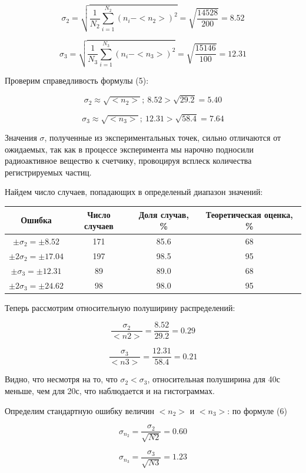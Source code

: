 \documentclass[14pt]{article}
\begin{document}
$$\sigma_2 = \sqrt{\frac{1}{N_2} \sum_{i = 1}^{N_2} (n_i - <n_2>)^2} = \sqrt{\frac{14528}{200}} = 8.52$$

$$\sigma_3 = \sqrt{\frac{1}{N_3} \sum_{i = 1}^{N_3} (n_i - <n_3>)^2} = \sqrt{\frac{15146}{100}} = 12.31$$

Проверим справедливость формулы (5):


$$\sigma_2 \approx \sqrt{<n_2>}; ~ 8.52  > \sqrt{29.2} = 5.40$$

$$\sigma_3 \approx \sqrt{<n_3>}; ~ 12.31 > \sqrt{58.4} = 7.64$$

Значения $\sigma$, полученные из экспериментальных точек, сильно отличаются от ожидаемых, так как в процессе эксперимента мы нарочно подносили радиоактивное вещество к счетчику, провоцируя всплеск количества регистрируемых частиц.

Найдем число случаев, попадающих в определеный диапазон значений:

\begin{center}
\begin{tabular}{|c|c|c|c|}
\hline
Ошибка							&	Число случаев	&	Доля случав, \%		&	Теоретическая оценка, \%	\\
\hline
$\pm\sigma_2 = \pm 8.52$		&	171				&	85.6				&	68							\\
\hline
$\pm 2\sigma_2 = \pm 17.04$		&	197				&	98.5				&	95							\\
\hline
$\pm\sigma_3 = \pm 12.31$		&	89				&	89.0				&	68							\\
\hline
$\pm 2\sigma_3 = \pm 24.62$		&	98				&	98.0				&	95							\\
\hline
\end{tabular}
\end{center}


Теперь рассмотрим относительную полуширину распределений:

$$\frac{\sigma_2}{<n2>} = \frac{8.52}{29.2}  = 0.29$$

$$\frac{\sigma_3}{<n3>} = \frac{12.31}{58.4} = 0.21$$

Видно, что несмотря на то, что $\sigma_2 < \sigma_3$, относительная полуширина для 40с меньше, чем для 20с, что наблюдается и на гистограммах.

Определим стандартную ошибку величин $<n_2>$ и $<n_3>$: по формуле (6)

$$\sigma_{n_2} = \frac{\sigma_2}{\sqrt{N2}} = 0.60$$

$$\sigma_{n_3} = \frac{\sigma_3}{\sqrt{N3}} = 1.23$$
\end{document}
